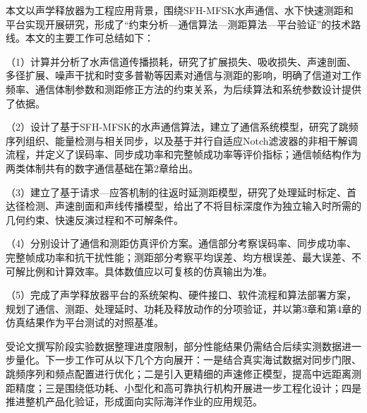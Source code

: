 \begin{conclusions}

本文以声学释放器为工程应用背景，围绕SFH-MFSK水声通信、水下快速测距和平台实现开展研究，形成了“约束分析—通信算法—测距算法—平台验证”的技术路线。本文的主要工作可总结如下：

（1）计算并分析了水声信道传播损耗，研究了扩展损失、吸收损失、声速剖面、多径扩展、噪声干扰和时变多普勒等因素对通信与测距的影响，明确了信道对工作频率、通信体制参数和测距修正方法的约束关系，为后续算法和系统参数设计提供了依据。

（2）设计了基于SFH-MFSK的水声通信算法，建立了通信系统模型，研究了跳频序列组织、能量检测与相关同步，以及基于并行自适应Notch滤波器的非相干解调流程，并定义了误码率、同步成功率和完整帧成功率等评价指标；通信帧结构作为两类体制共有的数字通信基础在第2章给出。

（3）建立了基于请求—应答机制的往返时延测距模型，研究了处理延时标定、首达径检测、声速剖面和声线传播模型，给出了不将目标深度作为独立输入时所需的几何约束、快速反演过程和不可解条件。

（4）分别设计了通信和测距仿真评价方案。通信部分考察误码率、同步成功率、完整帧成功率和抗干扰性能；测距部分考察平均误差、均方根误差、最大误差、不可解比例和计算效率。具体数值应以可复核的仿真输出为准。

（5）完成了声学释放器平台的系统架构、硬件接口、软件流程和算法部署方案，规划了通信、测距、处理延时、功耗及释放动作的分项验证，并以第3章和第4章的仿真结果作为平台测试的对照基准。

受论文撰写阶段实验数据整理进度限制，部分性能结果仍需结合后续实测数据进一步量化。下一步工作可从以下几个方向展开：一是结合真实海试数据对同步门限、跳频序列和频点配置进行优化；二是引入更精细的声速修正模型，提高中远距离测距精度；三是围绕低功耗、小型化和高可靠执行机构开展进一步工程化设计；四是推进整机产品化验证，形成面向实际海洋作业的应用规范。

\end{conclusions}
